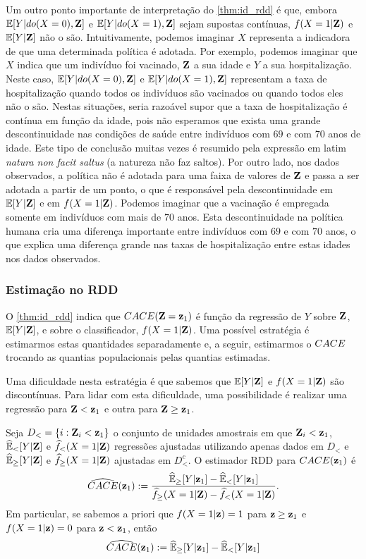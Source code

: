 Um outro ponto importante de interpretação do \cref{thm:id_rdd} é que,
embora ${\mathbb E}[Y|do(X=0),{\mathbf{Z}}]$ e ${\mathbb E}[Y|do(X=1),{\mathbf{Z}}]$ sejam supostas contínuas,
$f(X=1|{\mathbf{Z}})$ e ${\mathbb E}[Y|{\mathbf{Z}}]$ não o são. Intuitivamente,
podemos imaginar $X$ representa a indicadora de que
uma determinada política é adotada.
Por exemplo, podemos imaginar que $X$ indica que um indivíduo foi vacinado,
${\mathbf{Z}}$ a sua idade e $Y$ a sua hospitalização.
Neste caso, ${\mathbb E}[Y|do(X=0),{\mathbf{Z}}]$ e ${\mathbb E}[Y|do(X=1),{\mathbf{Z}}]$ representam
a taxa de hospitalização quando
todos os indivíduos são vacinados ou
quando todos eles não o são.
Nestas situações, seria razoável supor que
a taxa de hospitalização é contínua em função da idade, pois
não esperamos que exista uma grande descontinuidade 
nas condições de saúde entre
indivíduos com $69$ e com $70$ anos de idade.
Este tipo de conclusão muitas vezes é resumido pela expressão em latim
\textit{natura non facit saltus}
(a natureza não faz saltos).
Por outro lado, nos dados observados,
a política não é adotada para uma faixa de valores de ${\mathbf{Z}}$ e
passa a ser adotada a partir de um ponto,
o que é responsável pela descontinuidade em
${\mathbb E}[Y|{\mathbf{Z}}]$ e em $f(X=1|{\mathbf{Z}})$.
Podemos imaginar que a vacinação é empregada 
somente em indivíduos com mais de $70$ anos.
Esta descontinuidade na política humana cria
uma diferença importante entre indivíduos
com $69$ e com $70$ anos,
o que explica uma diferença grande 
nas taxas de hospitalização entre estas idades
nos dados observados.

\subsubsection{Estimação no RDD}

O \cref{thm:id_rdd} indica que ${CACE}({\mathbf{Z}}={\mathbf{z}}_1)$ é
função da regressão de $Y$ sobre ${\mathbf{Z}}$, ${\mathbb E}[Y|{\mathbf{Z}}]$, e
sobre o classificador, $f(X=1|{\mathbf{Z}})$.
Uma possível estratégia é estimarmos 
estas quantidades separadamente e, a seguir,
estimarmos o ${CACE}$ trocando
as quantias populacionais pelas quantias estimadas.

Uma dificuldade nesta estratégia é que
sabemos que ${\mathbb E}[Y|{\mathbf{Z}}]$ e $f(X=1|{\mathbf{Z}})$ são discontínuas.
Para lidar com esta dificuldade, 
uma possibilidade é 
realizar uma regressão para ${\mathbf{Z}} < {\mathbf{z}}_1$ e
outra para ${\mathbf{Z}} \geq {\mathbf{z}}_1$.

\begin{definition}
 \label{def:est_rdd}
 Seja $D_{<} = \{i: {\mathbf{Z}}_i < {\mathbf{z}}_1\}$
 o conjunto de unidades amostrais em que ${\mathbf{Z}}_i < {\mathbf{z}}_1$,
 $\widehat{{\mathbb E}}_{<}[Y|{\mathbf{Z}}]$ e $\widehat{f}_{<}(X=1|{\mathbf{Z}})$ regressões ajustadas
 utilizando apenas dados em $D_{<}$ e
 $\widehat{{\mathbb E}}_{\geq}[Y|{\mathbf{Z}}]$ e $\widehat{f}_{\geq}(X=1|{\mathbf{Z}})$ ajustadas
 em $D^{c}_{<}$.
 O estimador RDD para ${CACE}({\mathbf{z}}_1)$ é
 \begin{align*}
  {\widehat{{CACE}}}({\mathbf{z}}_1)
  := \frac{\widehat{{\mathbb E}}_{\geq}[Y|{\mathbf{z}}_1] - \widehat{{\mathbb E}}_{<}[Y|{\mathbf{z}}_1]}
  {\widehat{f}_{\geq}(X=1|{\mathbf{Z}}) - \widehat{f}_{<}(X=1|{\mathbf{Z}})}.
 \end{align*}
 Em particular, se sabemos a priori que
 $f(X=1|{\mathbf{z}}) = 1$ para ${\mathbf{z}} \geq {\mathbf{z}}_1$ e
 $f(X=1|{\mathbf{z}}) = 0$ para ${\mathbf{z}} < {\mathbf{z}}_1$, então
 \begin{align*}
  {\widehat{{CACE}}}({\mathbf{z}}_1)
  := \widehat{{\mathbb E}}_{\geq}[Y|{\mathbf{z}}_1] - \widehat{{\mathbb E}}_{<}[Y|{\mathbf{z}}_1]
 \end{align*}
\end{definition}

